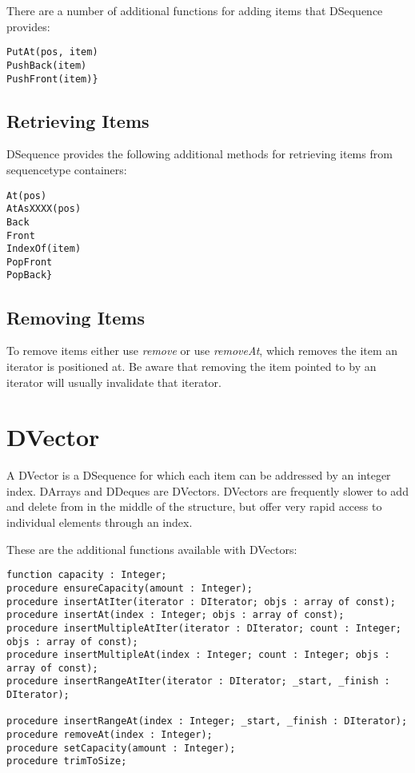 \documentclass{report}
\begin{document}
There are a number of additional functions for adding 
items that DSequence provides:

\begin{lstlisting}
PutAt(pos, item)
PushBack(item)
PushFront(item)}
\end{lstlisting}

\subsection{Retrieving Items}

DSequence provides the following additional methods for 
retrieving items from sequencetype containers:

\begin{lstlisting}
At(pos)
AtAsXXXX(pos)
Back
Front
IndexOf(item)
PopFront
PopBack}
\end{lstlisting}

\subsection{Removing Items}

To remove items either use \emph{remove} or use \emph{removeAt}, which
removes the item an iterator is positioned at. Be aware that removing the
item pointed to by an iterator will usually
invalidate that iterator.

\section{DVector}

A DVector is a DSequence for which each item can be addressed by an integer
index. DArrays and DDeques are DVectors. DVectors are frequently slower to
add and delete from in the middle of the structure, but offer very rapid
access to individual elements through an index.

These are the additional functions available with DVectors:

\begin{lstlisting}
function capacity : Integer;
procedure ensureCapacity(amount : Integer);
procedure insertAtIter(iterator : DIterator; objs : array of const);
procedure insertAt(index : Integer; objs : array of const);
procedure insertMultipleAtIter(iterator : DIterator; count : Integer; objs : array of const);
procedure insertMultipleAt(index : Integer; count : Integer; objs : array of const);
procedure insertRangeAtIter(iterator : DIterator; _start, _finish : DIterator);

procedure insertRangeAt(index : Integer; _start, _finish : DIterator);
procedure removeAt(index : Integer);
procedure setCapacity(amount : Integer);
procedure trimToSize;
\end{lstlisting}
\end{document}
